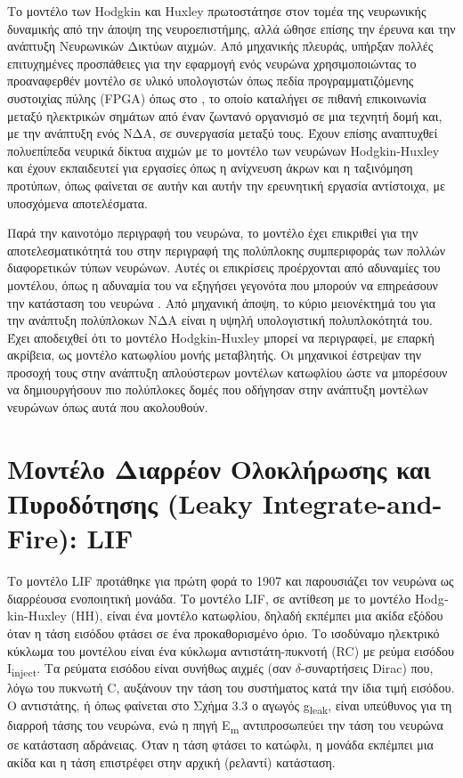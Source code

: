 \documentclass[12pt]{report}
\begin{document}
Το μοντέλο των \textlatin{Hodgkin} και \textlatin{Huxley} πρωτοστάτησε στον τομέα της νευρωνικής δυναμικής από την άποψη της νευροεπιστήμης, αλλά ώθησε επίσης την έρευνα και την ανάπτυξη Νευρωνικών Δικτύων αιχμών. Από μηχανικής πλευράς, υπήρξαν πολλές επιτυχημένες προσπάθειες για την εφαρμογή ενός νευρώνα χρησιμοποιώντας το προαναφερθέν μοντέλο σε υλικό υπολογιστών όπως πεδία προγραμματιζόμενης συστοιχίας πύλης (\textlatin{FPGA}) όπως στο \cite{Levi2018}, το οποίο καταλήγει σε πιθανή επικοινωνία μεταξύ ηλεκτρικών σημάτων από έναν ζωντανό οργανισμό σε μια τεχνητή δομή και, με την ανάπτυξη ενός ΝΔΑ, σε συνεργασία μεταξύ τους. Έχουν επίσης αναπτυχθεί πολυεπίπεδα νευρικά δίκτυα αιχμών με το μοντέλο των νευρώνων \textlatin{Hodgkin-Huxley} και έχουν εκπαιδευτεί για εργασίες όπως η ανίχνευση άκρων και η ταξινόμηση προτύπων, όπως φαίνεται σε αυτήν \cite{Yedjour2017} και αυτήν \cite{pattern2016} την ερευνητική εργασία αντίστοιχα, με υποσχόμενα αποτελέσματα.

Παρά την καινοτόμο περιγραφή του νευρώνα, το μοντέλο έχει επικριθεί για την αποτελεσματικότητά του στην περιγραφή της πολύπλοκης συμπεριφοράς των πολλών διαφορετικών τύπων νευρώνων. Αυτές οι επικρίσεις προέρχονται από αδυναμίες του μοντέλου, όπως η αδυναμία του να εξηγήσει γεγονότα που μπορούν να επηρεάσουν την κατάσταση του νευρώνα \cite{limit1993}. Από μηχανική άποψη, το κύριο μειονέκτημά του για την ανάπτυξη πολύπλοκων ΝΔΑ είναι η υψηλή υπολογιστική πολυπλοκότητά του. Έχει αποδειχθεί \cite{reduction1997} ότι το μοντέλο \textlatin{Hodgkin-Huxley} μπορεί να περιγραφεί, με επαρκή ακρίβεια, ως μοντέλο κατωφλίου μονής μεταβλητής. Οι μηχανικοί έστρεψαν την προσοχή τους στην ανάπτυξη απλούστερων μοντέλων κατωφλίου ώστε να μπορέσουν να δημιουργήσουν πιο πολύπλοκες δομές που οδήγησαν στην ανάπτυξη μοντέλων νευρώνων όπως αυτά που ακολουθούν.

\medskip

\section{Μοντέλο Διαρρέον Ολοκλήρωσης και Πυροδότησης \textlatin{(Leaky Integrate-and-Fire): LIF}}

Το μοντέλο \textlatin{LIF} προτάθηκε για πρώτη φορά το 1907 \cite{Brunel2007} και παρουσιάζει τον νευρώνα ως διαρρέουσα ενοποιητική μονάδα. Το μοντέλο \textlatin{LIF}, σε αντίθεση με το μοντέλο \textlatin{Hodgkin-Huxley (ΗΗ)}, είναι ένα μοντέλο κατωφλίου, δηλαδή εκπέμπει μια ακίδα εξόδου όταν η τάση εισόδου φτάσει σε ένα προκαθορισμένο όριο. Το ισοδύναμο ηλεκτρικό κύκλωμα του μοντέλου είναι ένα κύκλωμα αντιστάτη-πυκνοτή (\textlatin{RC}) με ρεύμα εισόδου \textlatin{I\textsubscript{inject}}. Τα ρεύματα εισόδου είναι συνήθως αιχμές (σαν \(\delta\)-συναρτήσεις \textlatin{Dirac}) που, λόγω του πυκνωτή \textlatin{C}, αυξάνουν την τάση του συστήματος κατά την ίδια τιμή εισόδου. Ο αντιστάτης, ή όπως φαίνεται στο Σχήμα 3.3 ο αγωγός \textlatin{g\textsubscript{leak}}, είναι υπεύθυνος για τη διαρροή τάσης του νευρώνα, ενώ η πηγή \textlatin{E\textsubscript{m}} αντιπροσωπεύει την τάση του νευρώνα σε κατάσταση αδράνειας. Όταν η τάση φτάσει το κατώφλι, η μονάδα εκπέμπει μια ακίδα και η τάση επιστρέφει στην αρχική (ρελαντί) κατάσταση.
\end{document}
